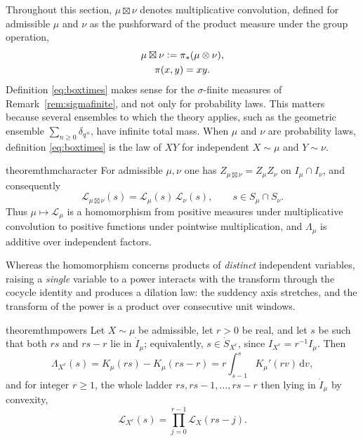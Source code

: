 \documentclass[sn-mathphys-num]{sn-jnl}
\theoremstyle{thmstyleone}%
\theoremstyle{thmstyletwo}%
\theoremstyle{thmstylethree}%
\theoremstyle{thmstyleone}%
\providecommand{\Leh}{\mathscr{L}}
\providecommand{\dd}{\,\mathrm{d}}
\providecommand{\eqdef}{\mathrel{\vcentcolon=}}
\begin{document}
	Throughout this section, $\mu\boxtimes\nu$ denotes multiplicative
	convolution, defined for admissible $\mu$ and $\nu$ as the
	pushforward of the product measure under the group operation,
	\begin{equation}\label{eq:boxtimes}
		\begin{gathered}
			\mu\boxtimes\nu\eqdef\pi_*(\mu\otimes\nu),\\
			\pi(x,y)=xy .
		\end{gathered}
	\end{equation}
	Definition \eqref{eq:boxtimes} makes sense for the $\sigma$-finite
	measures of Remark~\ref{rem:sigmafinite}, and not only for
	probability laws. This matters because several ensembles to which
	the theory applies, such as the geometric ensemble
	$\sum_{n\ge0}\delta_{q^{\,n}}$, have infinite total mass. When $\mu$ and $\nu$ are
	probability laws, definition \eqref{eq:boxtimes} is the law of $XY$
	for independent $X\sim\mu$ and $Y\sim\nu$.
	
	\begin{restatable}{theorem}{thmcharacter}\label{thm:homo}
		For admissible $\mu,\nu$ one has $Z_{\mu\boxtimes\nu}=Z_\mu
		Z_\nu$ on $I_\mu\cap I_\nu$, and consequently
		\begin{equation}\label{eq:homo}
			\Leh_{\mu\boxtimes\nu}(s)=\Leh_\mu(s)\,\Leh_\nu(s),
			\qquad s\in S_\mu\cap S_\nu .
		\end{equation}
		Thus $\mu\mapsto\Leh_\mu$ is a homomorphism from positive measures
		under multiplicative convolution to positive functions under
		pointwise multiplication, and $\Lambda_\mu$ is additive over
		independent factors.
	\end{restatable}
	
	
	Whereas the homomorphism concerns products of \emph{distinct}
	independent variables, raising a \emph{single} variable to a power
	interacts with the transform through the cocycle identity and
	produces a dilation law: the suddency axis stretches, and the
	transform of the power is a product over consecutive unit windows.
	
	\begin{restatable}[Powers]{theorem}{thmpowers}\label{thm:power}
		Let $X\sim\mu$ be admissible, let $r>0$ be real, and let $s$ be
		such that both $rs$ and $rs-r$ lie in $\mathring I_\mu$;
		equivalently, $s\in\mathring S_{X^r}$, since
		$I_{X^r}=r^{-1}I_\mu$. Then
		\begin{equation}\label{eq:powerlog}
			\Lambda_{X^r}(s)=K_\mu(rs)-K_\mu(rs-r)
			=r\int_{s-1}^{s}K_\mu'(rv)\dd v ,
		\end{equation}
		and for integer $r\ge1$, the whole ladder
		$rs,rs-1,\dots,rs-r$ then lying in $\mathring I_\mu$ by convexity,
		\begin{equation}\label{eq:power}
			\Leh_{X^r}(s)=\prod_{j=0}^{r-1}\Leh_X(rs-j).
		\end{equation}
	\end{restatable}
	
\end{document}
